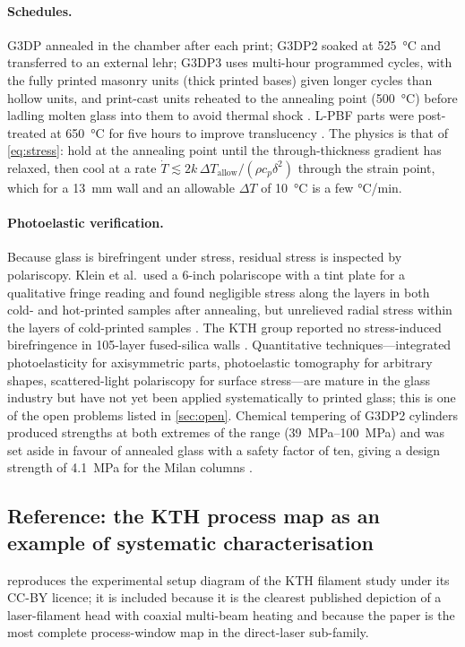 \paragraph{Schedules.} G3DP annealed in the chamber after each print; G3DP2 soaked at \SI{525}{\celsius} and transferred to an external lehr; G3DP3 uses multi-hour programmed cycles, with the fully printed masonry units (thick printed bases) given longer cycles than hollow units, and print-cast units reheated to the annealing point (\SI{500}{\celsius}) before ladling molten glass into them to avoid thermal shock \citep{klein2015,inamura2018,mit2024masonry}. L-PBF parts were post-treated at \SI{650}{\celsius} for five hours to improve translucency \citep{datsiou2019}. The physics is that of \cref{eq:stress}: hold at the annealing point until the through-thickness gradient has relaxed, then cool at a rate \(\dot{T} \lesssim 2k\,\Delta T_{\mathrm{allow}}/(\rho c_p \delta^{2})\) through the strain point, which for a \SI{13}{mm} wall and an allowable \(\Delta T\) of \SI{10}{\celsius} is a few \si{\celsius}/min.

\paragraph{Photoelastic verification.} Because glass is birefringent under stress, residual stress is inspected by polariscopy. Klein et al.\ used a 6-inch polariscope with a tint plate for a qualitative fringe reading and found negligible stress along the layers in both cold- and hot-printed samples after annealing, but unrelieved radial stress within the layers of cold-printed samples \citep{klein2015}. The KTH group reported no stress-induced birefringence in 105-layer fused-silica walls \citep{kth2022bonding}. Quantitative techniques---integrated photoelasticity for axisymmetric parts, photoelastic tomography for arbitrary shapes, scattered-light polariscopy for surface stress---are mature in the glass industry \citep{aben2008} but have not yet been applied systematically to printed glass; this is one of the open problems listed in \cref{sec:open}. Chemical tempering of G3DP2 cylinders produced strengths at both extremes of the range (\SIrange{39}{100}{MPa}) and was set aside in favour of annealed glass with a safety factor of ten, giving a design strength of \SI{4.1}{MPa} for the Milan columns \citep{inamura2018}.

\subsection{Reference: the KTH process map as an example of systematic characterisation}
 reproduces the experimental setup diagram of the KTH filament study under its CC-BY licence; it is included because it is the clearest published depiction of a laser-filament head with coaxial multi-beam heating and because the paper is the most complete process-window map in the direct-laser sub-family.

